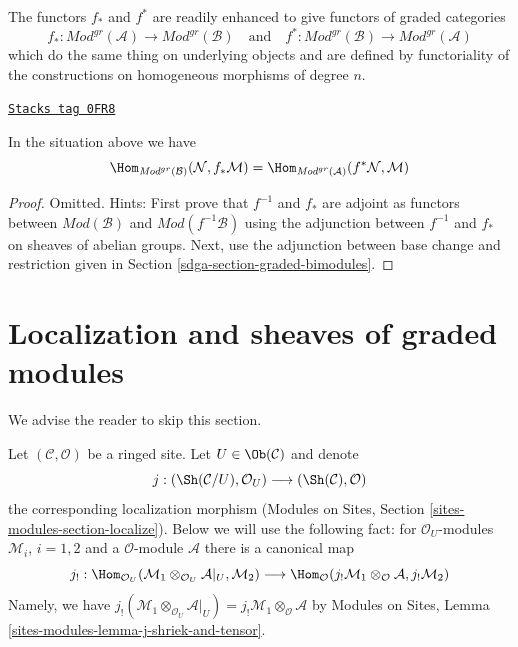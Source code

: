 \medskip\noindent
The functors $f_*$ and $f^*$ are readily enhanced to give
functors of graded categories
$$
f_* :
\textit{Mod}^{gr}(\mathcal{A})
\longrightarrow
\textit{Mod}^{gr}(\mathcal{B})
\quad\text{and}\quad
f^* :
\textit{Mod}^{gr}(\mathcal{B})
\longrightarrow
\textit{Mod}^{gr}(\mathcal{A})
$$
which do the same thing on underlying objects and are defined
by functoriality of the constructions on homogeneous morphisms
of degree $n$.

\begin{lemma}
\label{sdga-lemma-adjunction-push-pull-gr}
\href{https://stacks.math.columbia.edu/tag/0FR8}{\texttt{Stacks tag 0FR8}}

In the situation above we have
$$
\Hom_{\textit{Mod}^{gr}(\mathcal{B})}(
\mathcal{N}, f_*\mathcal{M}) =
\Hom_{\textit{Mod}^{gr}(\mathcal{A})}(
f^*\mathcal{N}, \mathcal{M})
$$
\end{lemma}

\begin{proof}
Omitted. Hints: First prove that $f^{-1}$ and $f_*$ are adjoint
as functors between $\textit{Mod}(\mathcal{B})$ and
$\textit{Mod}(f^{-1}\mathcal{B})$ using the adjunction between
$f^{-1}$ and $f_*$ on sheaves of abelian groups.
Next, use the adjunction between base change and restriction
given in Section \ref{sdga-section-graded-bimodules}.
\end{proof}

\section{Localization and sheaves of graded modules}
\label{sdga-section-localize-graded}
We advise the reader to skip this section.

\medskip\noindent
Let $(\mathcal{C}, \mathcal{O})$ be a ringed site.
Let $U \in \Ob(\mathcal{C})$ and denote
$$
j :
(\Sh(\mathcal{C}/U), \mathcal{O}_U)
\longrightarrow
(\Sh(\mathcal{C}), \mathcal{O})
$$
the corresponding localization morphism
(Modules on Sites, Section \ref{sites-modules-section-localize}).
Below we will use the following fact: for $\mathcal{O}_U$-modules
$\mathcal{M}_i$, $i = 1, 2$ and a $\mathcal{O}$-module $\mathcal{A}$
there is a canonical map
$$
j_! :
\Hom_{\mathcal{O}_U}(
\mathcal{M}_1 \otimes_{\mathcal{O}_U} \mathcal{A}|_U, \mathcal{M}_2)
\longrightarrow
\Hom_\mathcal{O}(
j_!\mathcal{M}_1 \otimes_\mathcal{O} \mathcal{A}, j_!\mathcal{M}_2)
$$
Namely, we have
$j_!(\mathcal{M}_1 \otimes_{\mathcal{O}_U} \mathcal{A}|_U) =
j_!\mathcal{M}_1 \otimes_\mathcal{O} \mathcal{A}$ by
Modules on Sites, Lemma \ref{sites-modules-lemma-j-shriek-and-tensor}.

